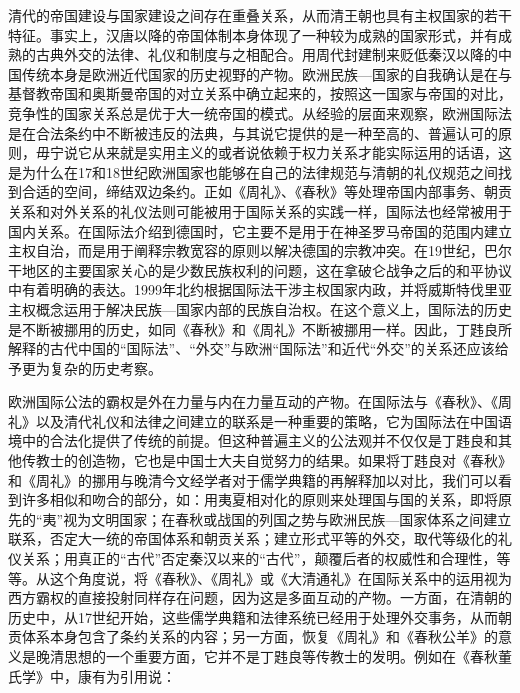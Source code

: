 \documentclass[a4paper, 12pt, openright]{ctexbook}
\begin{document}
清代的帝国建设与国家建设之间存在重叠关系，从而清王朝也具有主权国家的若干特征。事实上，汉唐以降的帝国体制本身体现了一种较为成熟的国家形式，并有成熟的古典外交的法律、礼仪和制度与之相配合。用周代封建制来贬低秦汉以降的中国传统本身是欧洲近代国家的历史视野的产物。欧洲民族—国家的自我确认是在与基督教帝国和奥斯曼帝国的对立关系中确立起来的，按照这一国家与帝国的对比，竞争性的国家关系总是优于大一统帝国的模式。从经验的层面来观察，欧洲国际法是在合法条约中不断被违反的法典，与其说它提供的是一种至高的、普遍认可的原则，毋宁说它从来就是实用主义的或者说依赖于权力关系才能实际运用的话语，这是为什么在17和18世纪欧洲国家也能够在自己的法律规范与清朝的礼仪规范之间找到合适的空间，缔结双边条约。正如《周礼》、《春秋》等处理帝国内部事务、朝贡关系和对外关系的礼仪法则可能被用于国际关系的实践一样，国际法也经常被用于国内关系。在国际法介绍到德国时，它主要不是用于在神圣罗马帝国的范围内建立主权自治，而是用于阐释宗教宽容的原则以解决德国的宗教冲突。在19世纪，巴尔干地区的主要国家关心的是少数民族权利的问题，这在拿破仑战争之后的和平协议中有着明确的表达。1999年北约根据国际法干涉主权国家内政，并将威斯特伐里亚主权概念运用于解决民族—国家内部的民族自治权。在这个意义上，国际法的历史是不断被挪用的历史，如同《春秋》和《周礼》不断被挪用一样。因此，丁韪良所解释的古代中国的“国际法”、“外交”与欧洲“国际法”和近代“外交”的关系还应该给予更为复杂的历史考察。

欧洲国际公法的霸权是外在力量与内在力量互动的产物。在国际法与《春秋》、《周礼》以及清代礼仪和法律之间建立的联系是一种重要的策略，它为国际法在中国语境中的合法化提供了传统的前提。但这种普遍主义的公法观并不仅仅是丁韪良和其他传教士的创造物，它也是中国士大夫自觉努力的结果。如果将丁韪良对《春秋》和《周礼》的挪用与晚清今文经学者对于儒学典籍的再解释加以对比，我们可以看到许多相似和吻合的部分，如：用夷夏相对化的原则来处理国与国的关系，即将原先的“夷”视为文明国家；在春秋或战国的列国之势与欧洲民族—国家体系之间建立联系，否定大一统的帝国体系和朝贡关系；建立形式平等的外交，取代等级化的礼仪关系；用真正的“古代”否定秦汉以来的“古代”，颠覆后者的权威性和合理性，等等。从这个角度说，将《春秋》、《周礼》或《大清通礼》在国际关系中的运用视为西方霸权的直接投射同样存在问题，因为这是多面互动的产物。一方面，在清朝的历史中，从17世纪开始，这些儒学典籍和法律系统已经用于处理外交事务，从而朝贡体系本身包含了条约关系的内容；另一方面，恢复《周礼》和《春秋公羊》的意义是晚清思想的一个重要方面，它并不是丁韪良等传教士的发明。例如在《春秋董氏学》中，康有为引用说：
\end{document}
